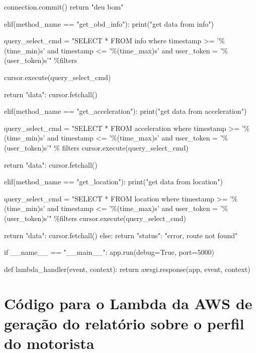 \begin{python}
        connection.commit()
        return "deu bom"
    
    elif(method_name == "get_obd_info"):
        print("get data from info")
        
        query_select_cmd = "SELECT * FROM info where timestamp >= 
            '\%(time_min)s' and timestamp <= '\%(time_max)s' 
            and user_token = '\%(user_token)s'" \%filters

        cursor.execute(query_select_cmd)

        return {"data": cursor.fetchall()}
    
    elif(method_name == "get_acceleration"):
        print("get data from acceleration")

        query_select_cmd = "SELECT * FROM acceleration where timestamp >= 
            '\%(time_min)s' and timestamp <= '\%(time_max)s' 
            and user_token = '\%(user_token)s'" \% filters
        cursor.execute(query_select_cmd)

        return {"data": cursor.fetchall()}
    
    elif(method_name == "get_location"):
        print("get data from location")

        query_select_cmd = "SELECT * FROM location where timestamp >= 
            '\%(time_min)s' and timestamp <= '\%(time_max)s' 
            and user_token = '\%(user_token)s'" \%filters
        cursor.execute(query_select_cmd)

        return {"data": cursor.fetchall()}
    else:
        return {"status": "error, route not found"}

if __name__ == "__main__":
    app.run(debug=True, port=5000)


def lambda_handler(event, context):
    return awsgi.response(app, event, context)

\end{python}






\section{Código para o Lambda da AWS de geração do relatório sobre o perfil do motorista}

